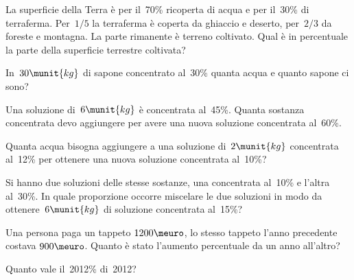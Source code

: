 \begin{htmulticols}{2}
\begin{esercizio}
\label{ese:3.107}
La superficie della Terra è per il~70\% ricoperta di acqua e per il~30\% 
di terraferma.
Per~\(1/5\) la terraferma è coperta da ghiaccio e deserto, per~\(2/3\) da 
foreste e montagna.
La parte rimanente è terreno coltivato. Qual è in percentuale la parte 
della superficie terrestre coltivata?
\end{esercizio}

\begin{esercizio}[*]
\label{ese:3.108}
In~\(30\munit{kg}\) di sapone concentrato al~30\% quanta acqua e quanto 
sapone ci sono?
\end{esercizio}

\begin{esercizio}
\label{ese:3.109}
Una soluzione di~\(6\munit{kg}\) è concentrata al~45\%. Quanta sostanza 
concentrata devo aggiungere per avere una nuova soluzione concentrata al~60\%.
\end{esercizio}

\begin{esercizio}
\label{ese:3.110}
Quanta acqua bisogna aggiungere a una soluzione di~\(2\munit{kg}\)
concentrata al~12\% per ottenere una nuova soluzione concentrata al~10\%?
\end{esercizio}

\begin{esercizio}
\label{ese:3.111}
Si hanno due soluzioni delle stesse sostanze, una concentrata al~10\% e 
l'altra al~30\%.
In quale proporzione occorre miscelare le due soluzioni in modo da 
ottenere~\(6\munit{kg}\) di soluzione concentrata al~15\%?
\end{esercizio}


\begin{esercizio}
\label{ese:3.113}
Una persona paga un tappeto \(1200\meuro\), lo stesso tappeto 
l'anno precedente costava \(900\meuro\).
Quanto è stato l'aumento percentuale da un anno all'altro?
\end{esercizio}

\begin{esercizio}
\label{ese:3.114}
Quanto vale il~2012\% di~2012?
\end{esercizio}
\end{htmulticols}


